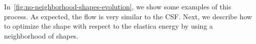 \documentclass[review]{siamart220329}
\begin{document}
In~\cref{fig:no-neighborhood-shapes-evolution}, we show some examples of this process. As expected, the flow is very similar to the CSF. Next, we describe how to optimize the shape with respect to the elastica energy by using a neighborhood of shapes.
%
%
%
\begin{figure}
	\center
	\hspace{2em}%
	\hspace{2em}%

\end{figure}
\end{document}
